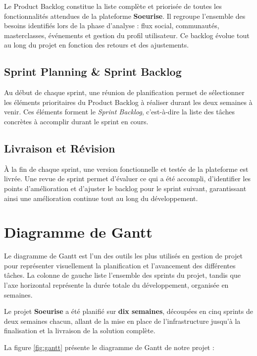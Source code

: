 \documentclass[12pt,a4paper]{report}
\begin{document}
	Le Product Backlog constitue la liste complète et priorisée de toutes les 
	fonctionnalités attendues de la plateforme \textbf{Soeurise}. Il regroupe l'ensemble 
	des besoins identifiés lors de la phase d'analyse : flux social, communautés, 
	masterclasses, événements et gestion du profil utilisateur. Ce backlog évolue tout 
	au long du projet en fonction des retours et des ajustements.
	
	\subsection{Sprint Planning \& Sprint Backlog}
	
	Au début de chaque sprint, une réunion de planification permet de sélectionner les 
	éléments prioritaires du Product Backlog à réaliser durant les deux semaines à venir. 
	Ces éléments forment le \textit{Sprint Backlog}, c'est-à-dire la liste des tâches 
	concrètes à accomplir durant le sprint en cours.
	
	\subsection{Livraison et Révision}
	
	À la fin de chaque sprint, une version fonctionnelle et testée de la plateforme est 
	livrée. Une revue de sprint permet d'évaluer ce qui a été accompli, d'identifier 
	les points d'amélioration et d'ajuster le backlog pour le sprint suivant, garantissant 
	ainsi une amélioration continue tout au long du développement.
	
	\section{Diagramme de Gantt}
	
	Le diagramme de Gantt est l'un des outils les plus utilisés en gestion de projet 
	pour représenter visuellement la planification et l'avancement des différentes tâches. 
	La colonne de gauche liste l'ensemble des sprints du projet, tandis que l'axe 
	horizontal représente la durée totale du développement, organisée en semaines.
	
	Le projet \textbf{Soeurise} a été planifié sur \textbf{dix semaines}, découpées 
	en cinq sprints de deux semaines chacun, allant de la mise en place de l'infrastructure 
	jusqu'à la finalisation et la livraison de la solution complète.
	
	La figure \ref{fig:gantt} présente le diagramme de Gantt de notre projet :
	
\end{document}
